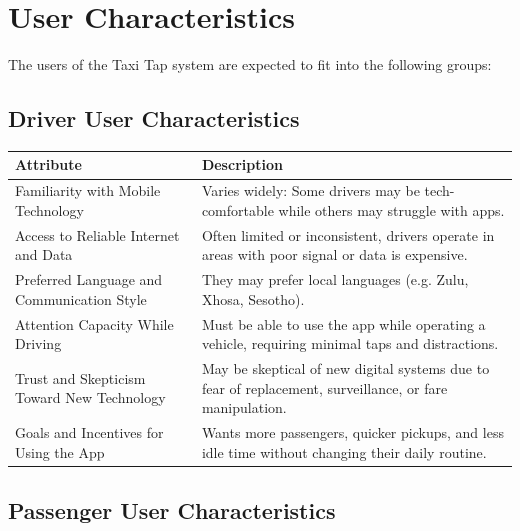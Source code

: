 \documentclass[a4paper,12pt]{article}
\begin{document}
\section{User Characteristics}

The users of the Taxi Tap system are expected to fit into the following groups:

\subsection{Driver User Characteristics}

\begin{longtable}{>{\raggedright}p{5cm} p{10cm}}
\toprule
\textbf{Attribute} & \textbf{Description} \\
\midrule
Familiarity with Mobile Technology & Varies widely: Some drivers may be tech-comfortable while others may struggle with apps. \\
Access to Reliable Internet and Data & Often limited or inconsistent, drivers operate in areas with poor signal or data is expensive. \\
Preferred Language and Communication Style & They may prefer local languages (e.g. Zulu, Xhosa, Sesotho). \\
Attention Capacity While Driving & Must be able to use the app while operating a vehicle, requiring minimal taps and distractions. \\
Trust and Skepticism Toward New Technology & May be skeptical of new digital systems due to fear of replacement, surveillance, or fare manipulation. \\
Goals and Incentives for Using the App & Wants more passengers, quicker pickups, and less idle time without changing their daily routine. \\
\bottomrule
\end{longtable}

\subsection{Passenger User Characteristics}
\end{document}
